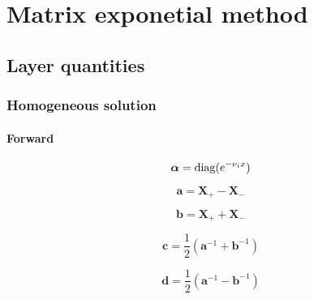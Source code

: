%
\section{Matrix exponetial method}
\label{sec:mem}


\subsection{Layer quantities}
\label{sec:mem-layer_quantities}


\subsubsection{Homogeneous solution}
\label{sec:mem-layer_quantities-homogeneous_solution}


\paragraph{Forward}
\label{sec:mem-layer_quantities-homogeneous_solution-forward}

\begin{equation}
\boldsymbol{\alpha} = \mathrm{diag}(e^{-\nu_{i}x})
\label{eq:mem-layer_quantities-homogeneous_solution-forward-alpha}
\end{equation}

\begin{equation}
\mathbf{a} = \mathbf{X}_{+} - \mathbf{X}_{-}
\label{eq:mem-layer_quantities-homogeneous_solution-forward-a}
\end{equation}

\begin{equation}
\mathbf{b} = \mathbf{X}_{+} + \mathbf{X}_{-}
\label{eq:mem-layer_quantities-homogeneous_solution-forward-b}
\end{equation}

\begin{equation}
\mathbf{c} = \frac{1}{2} (\mathbf{a}^{-1} + \mathbf{b}^{-1})
\label{eq:mem-layer_quantities-homogeneous_solution-forward-c}
\end{equation}

\begin{equation}
\mathbf{d} = \frac{1}{2} (\mathbf{a}^{-1} - \mathbf{b}^{-1})
\label{eq:mem-layer_quantities-homogeneous_solution-forward-d}
\end{equation}

